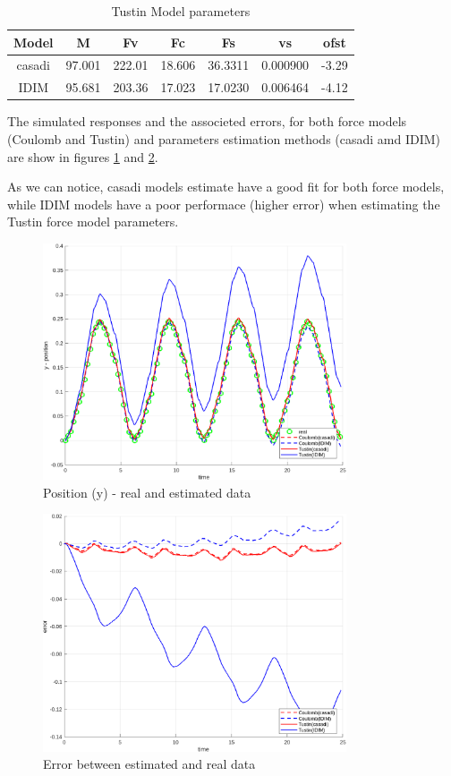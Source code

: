 \documentclass[10pt, a4paper]{article}
\begin{document}
\begin{table}[H]
      \small
      \centering
      \caption{Tustin Model parameters}
      \begin{tabular}{c|c|c|c|c|c|c}
            Model &  M & Fv & Fc & Fs & vs & ofst \\
            \hline
            casadi & 97.001 & 222.01 & 18.606 & 36.3311 & 0.000900 & -3.29 \\
            IDIM   & 95.681 & 203.36 & 17.023 & 17.0230 & 0.006464 & -4.12 \\
      \end{tabular}
      \label{table:m2}
\end{table}

The simulated responses and the associeted errors, for both force models (Coulomb and Tustin) and parameters estimation methods (casadi amd IDIM) are show in figures \ref{fig:y} and \ref{fig:e}.

As we can notice, casadi models estimate have a good fit for both force models, while IDIM models have a poor performace (higher error) when estimating the Tustin force model parameters.

\begin{figure}[H]
      \centering
      \includegraphics[width=0.8\textwidth]{y.PNG}
      \caption{Position (y) - real and estimated data}
      \label{fig:y}
\end{figure}

\begin{figure}[H]
      \centering
      \includegraphics[width=0.8\textwidth]{e.PNG}
      \caption{Error between estimated and real data}
      \label{fig:e}
\end{figure}
\end{document}
